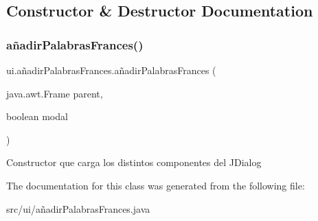 \subsection{Constructor \& Destructor Documentation}
\mbox{\label{classui_1_1a_xC3_xB1adir_palabras_frances_aea36658701adb44f6ef77de617203858}} 
\subsubsection{\texorpdfstring{añadirPalabrasFrances()}{añadirPalabrasFrances()}}
{\footnotesize\ttfamily ui.\+añadir\+Palabras\+Frances.\+añadir\+Palabras\+Frances (\begin{DoxyParamCaption}\item[{java.\+awt.\+Frame}]{parent,  }\item[{boolean}]{modal }\end{DoxyParamCaption})\hspace{0.3cm}{\ttfamily [inline]}}

Constructor que carga los distintos componentes del J\+Dialog 

The documentation for this class was generated from the following file\+:\begin{DoxyCompactItemize}
\item 
src/ui/añadir\+Palabras\+Frances.\+java\end{DoxyCompactItemize}

